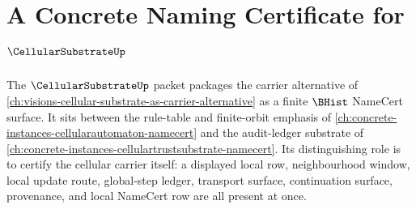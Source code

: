 \chapter{A Concrete Naming Certificate for $\CellularSubstrateUp$}
\label{ch:concrete-instances-cellularsubstrate-namecert}

The $\CellularSubstrateUp$ packet packages the carrier alternative of \autoref{ch:visions-cellular-substrate-as-carrier-alternative} as a finite $\BHist$ NameCert surface. It sits between the rule-table and finite-orbit emphasis of \autoref{ch:concrete-instances-cellularautomaton-namecert} and the audit-ledger substrate of \autoref{ch:concrete-instances-cellulartrustsubstrate-namecert}. Its distinguishing role is to certify the cellular carrier itself: a displayed local row, neighbourhood window, local update route, global-step ledger, transport surface, continuation surface, provenance, and local NameCert row are all present at once.



